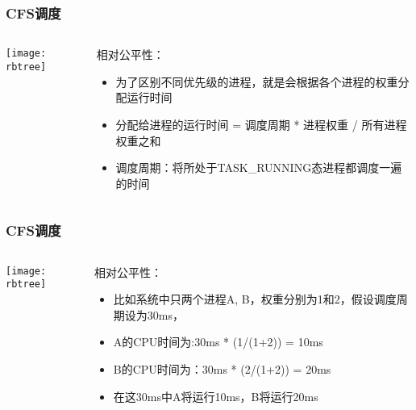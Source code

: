 \begin{frame}
	\frametitle{CFS调度}
	\begin{columns}
		\begin{column}{.4\textwidth}
			\Large \centering
			
			\texttt{[image: rbtree]}
			
		\end{column}
		
		\begin{column}{.6\textwidth}
			相对公平性：
			\begin{itemize}
				\item 为了区别不同优先级的进程，就是会根据各个进程的权重分配运行时间
				\item 分配给进程的运行时间 = 调度周期 * 进程权重 / 所有进程权重之和
				\item 调度周期：将所处于TASK\_RUNNING态进程都调度一遍的时间
				
			\end{itemize}
			
		\end{column}
	\end{columns}
\end{frame}


\begin{frame}
	\frametitle{CFS调度}
	\begin{columns}
		\begin{column}{.4\textwidth}
			\Large \centering
			
			\texttt{[image: rbtree]}
			
		\end{column}
		
		\begin{column}{.6\textwidth}
			相对公平性：
			\begin{itemize}
				\item 比如系统中只两个进程A, B，权重分别为1和2，假设调度周期设为30ms，
				\item A的CPU时间为:30ms * (1/(1+2)) = 10ms
				\item B的CPU时间为：30ms * (2/(1+2)) = 20ms
				\item 在这30ms中A将运行10ms，B将运行20ms
				
			\end{itemize}
			
		\end{column}
	\end{columns}
\end{frame}



